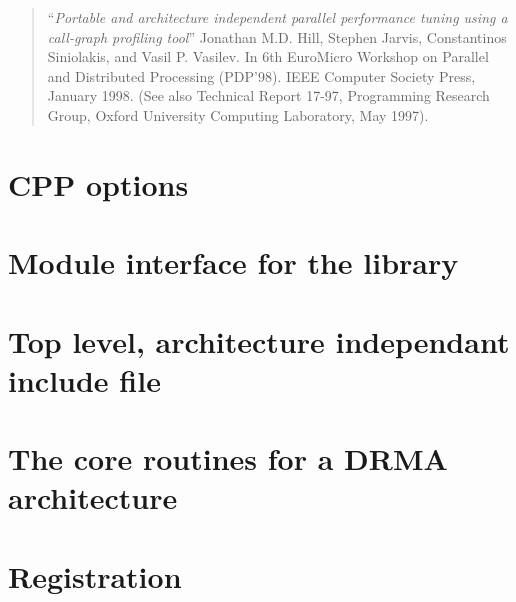 \documentclass[12pt]{report}
\begin{document}
\begin{quote}
\cite{hill:cg} ``\emph{Portable and architecture independent parallel
     performance tuning using a call-graph profiling tool}'' Jonathan
     M.D. Hill, Stephen Jarvis, Constantinos Siniolakis, and Vasil P.
     Vasilev. In 6th EuroMicro Workshop on Parallel and Distributed
     Processing (PDP'98).  IEEE Computer Society Press, January
     1998. (See also Technical Report 17-97, Programming Research
     Group, Oxford University Computing Laboratory, May 1997).
\end{quote}

\chapter{CPP options}
	

\chapter{Module interface for the library}
	

\chapter{Top level, architecture independant include file}
	

%	
%	
%	


\chapter{The core routines for a DRMA architecture}
	
	
	
	

%	
%	
	
\chapter{Registration}
	
	
\end{document}
